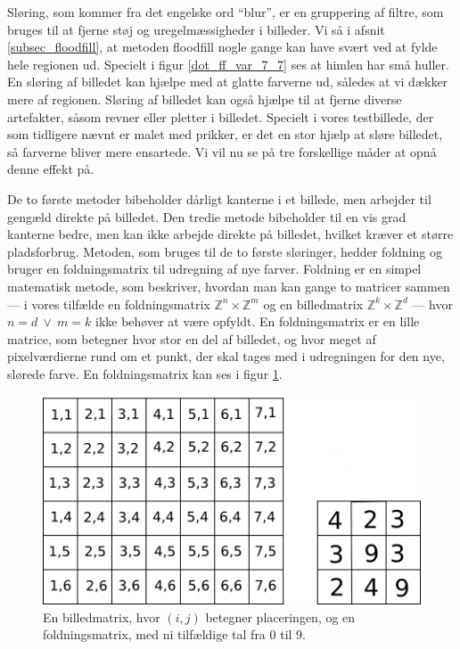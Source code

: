 {
Sløring, som kommer fra det engelske ord ``blur'', er en gruppering af
filtre, som bruges til at fjerne støj og uregelmæssigheder i billeder.
Vi så i afsnit \ref{subsec_floodfill}, at metoden floodfill nogle gange
kan have svært ved at fylde hele regionen ud. Specielt i figur
\ref{dot_ff_var_7_7} ses at himlen har små huller. En sløring af
billedet kan hjælpe med at glatte farverne ud, således at vi dækker mere
af regionen. Sløring af billedet kan også hjælpe til at fjerne diverse
artefakter, såsom revner eller pletter i billedet. Specielt i vores
testbillede, der som tidligere nævnt er malet med prikker, er det en
stor hjælp at sløre billedet, så farverne bliver mere ensartede. Vi vil
nu se på tre forskellige måder at opnå denne effekt på.

De to første metoder bibeholder dårligt kanterne i et billede, men
arbejder til gengæld direkte på billedet. Den tredie metode bibeholder
til en vis grad kanterne bedre, men kan ikke arbejde direkte på
billedet, hvilket kræver et større pladsforbrug. Metoden, som bruges til
de to første sløringer, hedder foldning og bruger en foldningsmatrix til
udregning af nye farver. Foldning er en simpel matematisk metode, som
beskriver, hvordan man kan gange to matricer sammen --- i vores tilfælde
en foldningsmatrix $\mathbb{Z}^{n}\times{} \mathbb{Z}^{m}$ og en
billedmatrix $\mathbb{Z}^{k}\times{} \mathbb{Z}^{d}$ --- hvor $n = d ~\vee~
m = k$ ikke behøver at være opfyldt.  En foldningsmatrix er en lille
matrice, som betegner hvor stor en del af billedet, og hvor meget af
pixelværdierne rund om et punkt, der skal tages med i udregningen for
den nye, slørede farve. En foldningsmatrix kan ses i figur \ref{Foldning}.
\begin{figure}[h]
	\begin{center}
		\includegraphics[scale=1,angle=0]{afsnit/vores_implementation/billeder/sloering/convolution}
	\end{center}
    \caption[]{En billedmatrix, hvor $(i,j)$ betegner placeringen, og en
    foldningsmatrix, med ni tilfældige tal fra 0 til 9.}
	\label{Foldning}
\end{figure}

}

